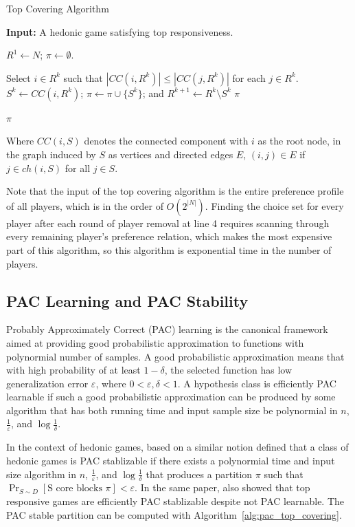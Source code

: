 \documentclass[letterpaper]{article} %
\begin{document}
\begin{algorithm}[htb]
  \caption{Top Covering Algorithm}
  \label{alg:top_covering}
  \textbf{Input:} A hedonic game satisfying top responsiveness.

  \begin{algorithmic}[1]
  \State $R^1 \leftarrow N$; $\pi \leftarrow \emptyset$.

    \State Select $i\in R^k$ such that $|CC(i,R^k)| \leq |CC(j,R^k)|$ for each $j\in R^k$.
    \State $S^k\leftarrow  CC(i,R^k)$; $\pi \leftarrow  \pi \cup \lbrace S^k \rbrace$;  and $R^{k+1} \leftarrow  R^k \setminus S^k$
      \State \Return $\pi$
    \EndIf
  \EndFor

  \State \Return $\pi$
 \end{algorithmic}
\end{algorithm}

Where $CC(i, S)$ denotes the connected component with $i$ as the root node, in the graph induced by $S$ as vertices and directed edges $E$, $(i, j) \in E$ if $j \in ch(i, S)$ for all $j \in S$.

Note that the input of the top covering algorithm is the entire preference profile of all players, which is in the order of $O(2^{|N|})$. Finding the choice set for every player after each round of player removal at line 4 requires scanning through every remaining player's preference relation, which makes the most expensive part of this algorithm, so this algorithm is exponential time in the number of players.

\subsection{PAC Learning and PAC Stability}
Probably Approximately Correct (PAC) learning is the canonical framework aimed at providing good probabilistic approximation to functions with polynormial number of samples. A good probabilistic approximation means that with high probability of at least $1 - \delta$, the selected function has low generalization error $\varepsilon$, where $0 < \varepsilon, \delta < 1$. A hypothesis class is efficiently PAC learnable if such a good probabilistic approximation can be produced by some algorithm that has both running time and input sample size be polynormial in $n$, $\frac{1}{\varepsilon}$, and $\log{\frac{1}{\delta}}$.

In the context of hedonic games, based on a similar notion \cite{ijcai2017-380} defined that a class of hedonic games is PAC stablizable if there exists a polynormial time and input size algorithm in $n$, $\frac{1}{\varepsilon}$, and $\log{\frac{1}{\delta}}$ that produces a partition $\pi$ such that $\Pr_{S\sim D}[\text{S core blocks } \pi] < \varepsilon$. In the same paper, \cite{ijcai2017-380} also showed that top responsive games are efficiently PAC stablizable despite not PAC learnable. The PAC stable partition can be computed with Algorithm~\ref{alg:pac_top_covering}.
\end{document}
